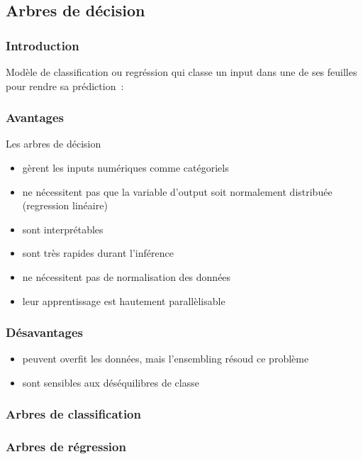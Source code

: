 \subsection{Arbres de décision}

\begin{frame}
  \frametitle{Introduction}
  Modèle de classification ou regréssion qui classe un input dans une
  de ses feuilles pour rendre sa prédiction :
\end{frame}

\begin{frame}
  \frametitle{Avantages}
  Les arbres de décision
  \begin{itemize}[<+->]
  \item gèrent les inputs numériques comme catégoriels
  \item ne nécessitent pas que la variable d'output soit normalement
    distribuée (regression linéaire)
  \item sont interprétables
  \item sont très rapides durant l'inférence
  \item ne nécessitent pas de normalisation des données
  \item leur apprentissage est hautement parallèlisable
  \end{itemize}
\end{frame}

\begin{frame}
  \frametitle{Désavantages}
  \begin{itemize}[<+->]
  \item peuvent overfit les données, mais l'ensembling résoud ce
    problème
  \item sont sensibles aux déséquilibres de classe
  \end{itemize}
\end{frame}

\begin{frame}
  \frametitle{Arbres de classification}
\end{frame}

\begin{frame}
  \frametitle{Arbres de régression}
\end{frame}

